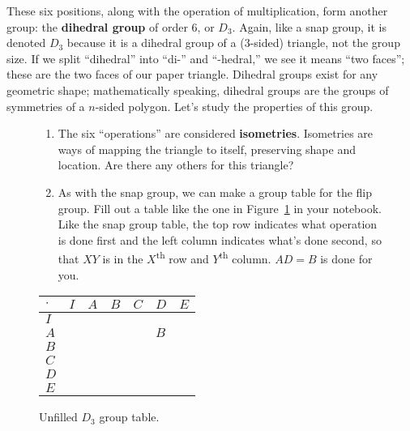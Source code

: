 \documentclass[../gatm.tex]{subfiles}
\begin{document}
These six positions, along with the operation of multiplication, form another group: the \textbf{dihedral group} of order $6$, or $D_3$. Again, like a snap group, it is denoted $D_3$ because it is a dihedral group of a ($3$-sided) triangle, not the group size. If we split ``dihedral'' into ``di-'' and ``-hedral,'' we see it means ``two faces''; these are the two faces of our paper triangle. Dihedral groups exist for any geometric shape; mathematically speaking, dihedral groups are the groups of symmetries of a $n$-sided polygon. Let's study the properties of this group.


\begin{figure}[H]
\begin{minipage}{0.6\textwidth}
\begin{enumerate}
\item The six ``operations'' are considered \textbf{isometries}. Isometries are ways of mapping the triangle to itself, preserving shape and location. Are there any others for this triangle?
\item As with the snap group, we can make a group table for the flip group. Fill out a table like the one in Figure~\ref{fig:sbstable} in your notebook. Like the snap group table, the top row indicates what operation is done first and the left column indicates what's done second, so that $XY$ is in the $X$\textsuperscript{th} row and $Y$\textsuperscript{th} column. $AD=B$ is done for you.
\setcounter{enumLast}{\theenumi}
\end{enumerate}
\end{minipage}\hfill%
\begin{minipage}{0.35\textwidth}\centering
\begin{tabular}{C|C|C|C|C|C|C|}
$\cdot$ & $I$ & $A$ & $B$ & $C$ & $D$ & $E$ \\ \hline
$I$    &   &   &   &   &   &   \\ \hline
$A$    &   &   &   &   & $B$  &   \\ \hline
$B$    &   &   &   &   &   &   \\ \hline
$C$    &   &   &   &   &   &   \\ \hline
$D$    &   &   &   &   &   &   \\ \hline
$E$    &   &   &   &   &   &   \\ \hline
\end{tabular}
\caption{Unfilled $D_3$ group table.}
\label{fig:sbstable}
\end{minipage}
\end{figure}
\end{document}

